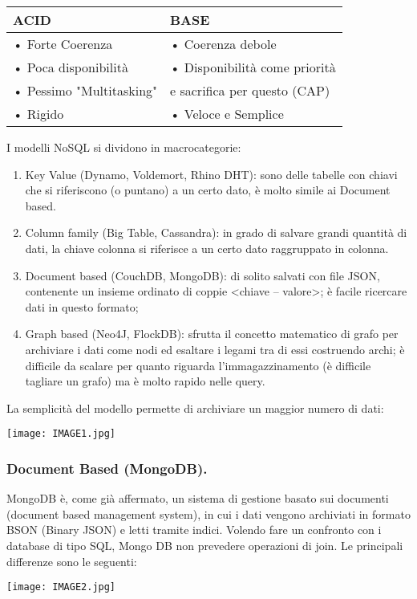 \documentclass[a4page, 11pt]{article}
\begin{document}
\begin{center}
\begin{tabular}{|l|l|}
\hline
ACID & BASE \\
\hline
• Forte Coerenza & • Coerenza debole \\
• Poca disponibilità & • Disponibilità come priorità \\
• Pessimo "Multitasking" & \quad e sacrifica per questo (CAP)\\
• Rigido & • Veloce e Semplice \\
\hline
\end{tabular}
\end{center}

I modelli NoSQL si dividono in macrocategorie:
\begin{enumerate}[noitemsep]
\item Key Value (Dynamo, Voldemort, Rhino DHT): sono delle tabelle con chiavi che si riferiscono (o puntano) a un certo dato, è molto simile ai Document based.
\item Column family (Big Table, Cassandra): in grado di salvare grandi quantità di dati, la chiave colonna si riferisce a un certo dato raggruppato in colonna.
\item Document based (CouchDB, MongoDB): di solito salvati con file JSON, contenente un insieme ordinato di coppie \textless{}chiave -- valore\textgreater{}; è facile ricercare dati in questo formato;
\item Graph based (Neo4J, FlockDB): sfrutta il concetto matematico di grafo per archiviare i dati come nodi ed esaltare i legami tra di essi costruendo archi; è difficile da scalare per quanto riguarda l'immagazzinamento (è difficile tagliare un grafo) ma è molto rapido nelle query.
\end{enumerate}

La semplicità del modello permette di archiviare un maggior numero di dati:
\begin{center}
	\texttt{[image: IMAGE1.jpg]}
\end{center}


\subsubsection{Document Based (MongoDB).}
MongoDB è, come già affermato, un sistema di gestione basato sui documenti (document based management system), in cui i dati vengono archiviati in formato BSON (Binary JSON) e letti tramite indici. Volendo fare un confronto con i database di tipo SQL, Mongo DB non prevedere operazioni di join. Le principali differenze sono le seguenti:
\begin{center}
	\texttt{[image: IMAGE2.jpg]}
\end{center}
\end{document}
